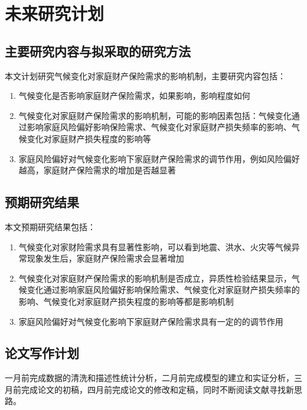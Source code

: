 \chapter{未来研究计划}

\section{主要研究内容与拟采取的研究方法}

本文计划研究气候变化对家庭财产保险需求的影响机制，主要研究内容包括：

\begin{enumerate}
    \item 气候变化是否影响家庭财产保险需求，如果影响，影响程度如何
    \item 气候变化对家庭财产保险需求的影响机制，可能的影响因素包括：气候变化通过影响家庭风险偏好影响保险需求、气候变化对家庭财产损失频率的影响、气候变化对家庭财产损失程度的影响等
    \item 家庭风险偏好对气候变化影响下家庭财产保险需求的调节作用，例如风险偏好越高，家庭财产保险需求的增加是否越显著
\end{enumerate}

\section{预期研究结果}

本文预期研究结果包括：

\begin{enumerate}
    \item 气候变化对家财险需求具有显著性影响，可以看到地震、洪水、火灾等气候异常现象发生后，家庭财产保险需求会显著增加
    \item 气候变化对家庭财产保险需求的影响机制是否成立，异质性检验结果显示，气候变化通过影响家庭风险偏好影响保险需求、气候变化对家庭财产损失频率的影响、气候变化对家庭财产损失程度的影响等都是影响机制
    \item 家庭风险偏好对气候变化影响下家庭财产保险需求具有一定的的调节作用
\end{enumerate}
\section{论文写作计划}

一月前完成数据的清洗和描述性统计分析，二月前完成模型的建立和实证分析，三月前完成论文的初稿，四月前完成论文的修改和定稿，同时不断阅读文献寻找新思路。
